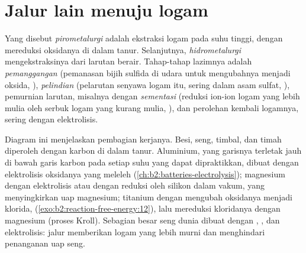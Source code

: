 \section{Jalur lain menuju logam}

\begin{definition}\label{def:b2:ellingham:metallurgy}
Yang disebut \emph{pirometalurgi} adalah ekstraksi
logam pada suhu tinggi, dengan mereduksi oksidanya di dalam tanur.
Selanjutnya, \emph{hidrometalurgi} mengekstraksinya
dari larutan berair. Tahap-tahap lazimnya adalah
\emph{pemanggangan} (pemanasan bijih sulfida di udara
untuk mengubahnya menjadi oksida, ),
\emph{pelindian} (pelarutan senyawa logam itu, sering
dalam asam sulfat, ), pemurnian larutan,
misalnya dengan \emph{sementasi} (reduksi ion-ion logam
yang lebih mulia oleh serbuk logam yang kurang mulia,
), dan perolehan kembali logamnya, sering
dengan elektrolisis.
\end{definition}

Diagram ini menjelaskan pembagian kerjanya. Besi, seng, timbal, dan timah
diperoleh dengan karbon di dalam tanur. Aluminium, yang garisnya terletak
jauh di bawah garis karbon pada setiap suhu yang dapat dipraktikkan,
dibuat dengan elektrolisis oksidanya yang meleleh
(\cref{ch:b2:batteries-electrolysis}); magnesium dengan elektrolisis atau
dengan reduksi oleh silikon dalam vakum, yang menyingkirkan uap
magnesium; titanium dengan mengubah oksidanya menjadi klorida,
 (\cref{exo:b2:reaction-free-energy:12}),
lalu mereduksi kloridanya dengan magnesium (proses Kroll). Sebagian besar
seng dunia dibuat dengan , , dan elektrolisis: jalur
 memberikan logam yang lebih murni dan menghindari
penanganan uap seng.

